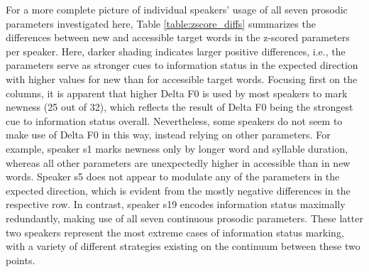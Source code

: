 For a more complete picture of individual speakers' usage of all seven prosodic parameters investigated here, Table \ref{table:zscore_diffs} summarizes the differences between new and accessible target words in the z-scored parameters per speaker. Here, darker shading indicates larger positive differences, i.e., the parameters serve as stronger cues to information status in the expected direction with higher values for new than for accessible target words. Focusing first on the columns, it is apparent that higher Delta F0 is used by most speakers to mark newness (25 out of 32), which reflects the result of Delta F0 being the strongest cue to information status overall. Nevertheless, some speakers do not seem to make use of Delta F0 in this way, instead relying on other parameters. For example, speaker s1 marks newness only by longer word and syllable duration, whereas all other parameters are unexpectedly higher in accessible than in new words. Speaker s5 does not appear to modulate any of the parameters in the expected direction, which is evident from the mostly negative differences in the respective row. In contrast, speaker s19 encodes information status maximally redundantly, making use of all seven continuous prosodic parameters. These latter two speakers represent the most extreme cases of information status marking, with a variety of different strategies existing on the continuum between these two points.

